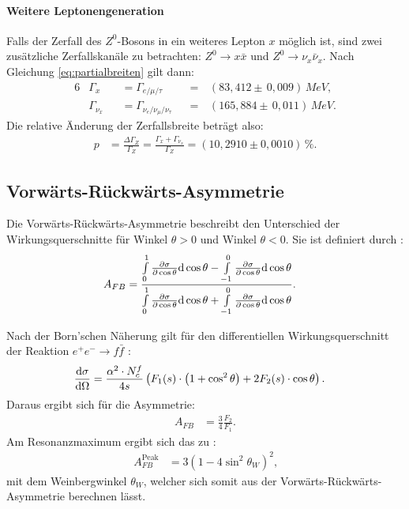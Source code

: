 \paragraph{Weitere Leptonengeneration} Falls der Zerfall des $Z^0$-Bosons in ein weiteres Lepton $x$ möglich ist, sind zwei zusätzliche Zerfallskanäle zu betrachten: $Z^0\rightarrow x\bar x$ und $Z^0\rightarrow \nu_x\bar{\nu}_x$. Nach Gleichung \ref{eq:partialbreiten} gilt dann:
\begin{alignat}{6}
	&\Gamma_x&&=\Gamma_{e/\mu/\tau}&&=&\,(83,412\pm\,0,009)\,\si{MeV}\text{,}\\
	&\Gamma_{\nu_x}&&=\Gamma_{\nu_e/\nu_\mu/\nu_\tau}&&=&\,(165,884\pm\,0,011)\,\si{MeV}\text{.}
\end{alignat}
Die relative Änderung der Zerfallsbreite beträgt also:
\begin{align}
	p&=\frac{\Delta\Gamma_Z}{\Gamma_Z}=\frac{\Gamma_x+\Gamma_{\nu_x}}{\Gamma_Z}=(10,2910\pm0,0010)\,\%\text{.}
\end{align}

\subsection{Vorwärts-Rückwärts-Asymmetrie}\label{sec:asymm}
Die Vorwärts-Rückwärts-Asymmetrie beschreibt den Unterschied der Wirkungsquerschnitte für Winkel $\theta>0$ und Winkel $\theta<0$. Sie ist definiert durch \cite{anleitungalt}:
\begin{align}
	A_{FB}&=\frac{\int\limits_0^1\del[\sigma]{\cos\theta}\mathrm d\cos\theta
		-\int\limits_{-1}^0\del[\sigma]{\cos\theta}\mathrm d\cos\theta}
	{\int\limits_0^1\del[\sigma]{\cos\theta}\mathrm d\cos\theta
		+\int\limits_{-1}^0\del[\sigma]{\cos\theta}\mathrm d\cos\theta}\text{.}\label{eq:asymm}
\end{align}

Nach der Born'schen Näherung gilt für den differentiellen Wirkungsquerschnitt der Reaktion $e^+e^-\rightarrow f\bar f$ \cite{anleitungalt}:
\begin{align}
	\diff[\sigma]{\Omega}&=\frac{\alpha^2\cdot N_c^f}{4s}\left(F_1(s)\cdot\left(1+\cos^2\theta\right)+2F_2(s)\cdot\cos\theta\right)\text{.}
\end{align}
Daraus ergibt sich für die Asymmetrie:
\begin{align}
	A_{FB}&=\frac34\frac{F_2}{F_1}\text{.}
\end{align}
Am Resonanzmaximum ergibt sich das zu \cite{anleitungalt}:
\begin{align}
	A_{FB}^{\mathrm{Peak}}&=3\left(1-4\sin^2\theta_W\right)^2\text{,}\label{eq:weinberg}
\end{align}
mit dem Weinbergwinkel $\theta_W$, welcher sich somit aus der Vorwärts-Rückwärts-Asymmetrie berechnen lässt.

